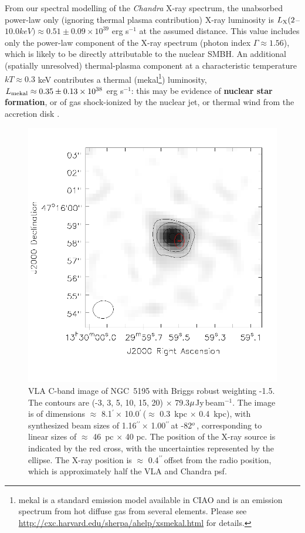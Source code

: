 \documentclass[fleqn,usenatbib]{mnras}
\def\deg{$^{o}\,$}
\def\arcm{$^{\prime}\,$}
\def\arcs{$^{\prime\prime}\,$}
\def\mujybm   {${\rm \mu}$Jy\,beam$^{-1}$}
\begin{document}
From our spectral modelling of the 
{\it Chandra} X-ray spectrum, the unabsorbed power-law only (ignoring thermal plasma contribution) X-ray luminosity is $L_{\rm X} (2$--$10.0 keV) \approx 0.51 \pm 0.09 \times 10^{39}$ erg s$^{-1}$ at the assumed 
distance. This value includes only the power-law component of the X-ray spectrum (photon index $\Gamma 
\approx 1.56$), which is likely to be directly attributable to the nuclear SMBH. An additional 
(spatially unresolved) thermal-plasma component at a characteristic temperature $kT \approx 0.3$ keV 
contributes a thermal (mekal\footnote{{mekal is a standard emission model available in CIAO and is an emission spectrum from hot diffuse gas from several elements.  Please see \url{http://cxc.harvard.edu/sherpa/ahelp/xsmekal.html} for details.}}) luminosity, $L_{\rm{mekal}} \approx 0.35 \pm 0.13 \times 10^{38}$ erg s$^{-1}$: this may be evidence 
of \textbf{nuclear star formation}, or of gas shock-ionized by the nuclear jet, {or thermal wind from the accretion disk \citep{Murrayetal1995,Steenbruggeetal2011}}. 


\begin{figure}
{\centering
\includegraphics[scale=0.3,clip=true,trim=0cm 2.3cm 1cm 1cm]{VLA_C_band_X_ray_positions.png}
\caption{VLA C-band image of NGC~5195 with Briggs robust weighting -1.5. The contours are (-3, 3, 5, 10, 15, 20) $\times$ 79.3\mujybm.  The image is of dimensions $\approx$ 8.1\arcm $\times$ 10.0\arcm ($\approx$ 0.3~kpc $\times$ 0.4~kpc), with synthesized beam sizes of 1.16\arcs $\times$ 1.00\arcs at -82\deg, corresponding to linear sizes of $\approx$ 46~pc $\times$ 40 pc. The position of the X-ray source is indicated by the red cross, with the uncertainties represented by the ellipse. The X-ray position is $\approx$ 0.4\arcs offset from the radio position, which is approximately half the VLA and Chandra psf. }
}
\label{fig:radio_xray_pos}
\end{figure}
\end{document}
